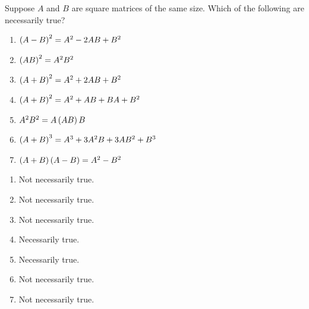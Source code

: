 \begin{enumialphparenastyle}

\begin{ex}
 Suppose $A$ and $B$ are square matrices of the same size. Which of the
following are necessarily true? 

\begin{enumerate}
\item $\left(A-B\right) ^{2}=A^{2}-2AB+B^{2}$ \

\item $\left(AB\right) ^{2}=A^{2}B^{2}$ \

\item $\left(A+B\right) ^{2}=A^{2}+2AB+B^{2}$ \

\item $\left(A+B\right) ^{2}=A^{2}+AB+BA+B^{2}$ \

\item $A^{2}B^{2}=A\left(AB\right) B$ \

\item $\left(A+B\right) ^{3}=A^{3}+3A^{2}B+3AB^{2}+B^{3}$ \

\item $\left(A+B\right) \left(A-B\right) =A^{2}-B^{2}$ \
\end{enumerate}

\begin{sol}
\begin{enumerate}
\item Not necessarily true.  
\item Not necessarily true.
\item Not necessarily true.
\item Necessarily true.
\item Necessarily true.
\item Not necessarily true.
\item Not necessarily true. 
\end{enumerate}
\end{sol}
\end{ex}

\end{enumialphparenastyle}